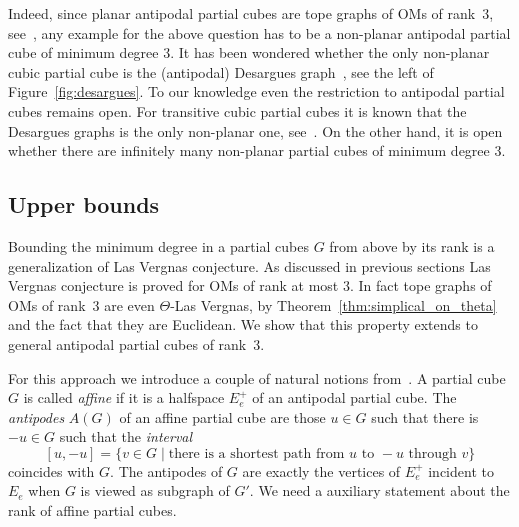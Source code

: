 \documentclass[final,11pt]{article}
\begin{document}
Indeed, since planar antipodal partial cubes are tope graphs of OMs of rank~$3$, see~\cite{Fuk-93}, any example for the above question has to be a non-planar antipodal partial cube of minimum degree $3$. It has been wondered whether the only non-planar cubic partial cube is the (antipodal) Desargues graph~\cite{Kla-08}, see the left of Figure~\ref{fig:desargues}. To our knowledge even the restriction to antipodal partial cubes remains open. For transitive cubic partial cubes it is known that the Desargues graphs is the only non-planar one, see~\cite{Mar-17}. On the other hand, it is open whether there are infinitely many non-planar partial cubes of minimum degree $3$.

\subsection{Upper bounds}

Bounding the minimum degree in a partial cubes $G$ from above by its rank is a generalization of Las Vergnas conjecture. As discussed in previous sections Las Vergnas conjecture is proved for OMs of rank at most $3$. In fact tope graphs of OMs of rank~$3$ are even $\Theta$-Las Vergnas, by Theorem~\ref{thm:simplical_on_theta} and the fact that they are Euclidean. We show that this property extends to general  antipodal partial cubes of rank~3. 

For this approach we introduce a couple of natural notions from~\cite{Kna-17}. A partial cube $G$ is called \emph{affine} if it is a halfspace $E_e^+$ of an antipodal partial  cube. The \emph{antipodes} $A(G)$ of an affine partial cube are those $u\in G$ such that there is $-u\in G$ such that the \emph{interval} $$[u,-u]=\{v\in G\mid \text{there is a shortest path from } u \text{ to } -u \text{ through } v\}$$ coincides with $G$. The antipodes of $G$ are exactly the vertices of $E_e^+$ incident to $E_e$ when $G$ is viewed as subgraph of $G'$. We need a auxiliary statement about the rank of affine partial cubes.
\end{document}
